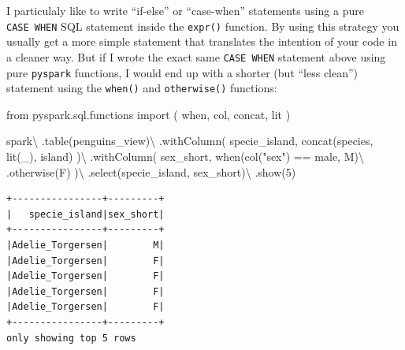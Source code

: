 \documentclass[
  11pt,
  letterpaper,
  DIV=11,
  numbers=noendperiod]{scrreprt}
\newenvironment{Shaded}{\begin{snugshade}}{\end{snugshade}}
\newcommand{\DecValTok}[1]{\textcolor[rgb]{0.68,0.00,0.00}{#1}}
\newcommand{\ImportTok}[1]{\textcolor[rgb]{0.00,0.46,0.62}{#1}}
\newcommand{\NormalTok}[1]{\textcolor[rgb]{0.00,0.23,0.31}{#1}}
\newcommand{\OperatorTok}[1]{\textcolor[rgb]{0.37,0.37,0.37}{#1}}
\newcommand{\StringTok}[1]{\textcolor[rgb]{0.13,0.47,0.30}{#1}}
\begin{document}
I particulaly like to write ``if-else'' or ``case-when'' statements
using a pure \texttt{CASE\ WHEN} SQL statement inside the
\texttt{expr()} function. By using this strategy you usually get a more
simple statement that translates the intention of your code in a cleaner
way. But if I wrote the exact same \texttt{CASE\ WHEN} statement above
using pure \texttt{pyspark} functions, I would end up with a shorter
(but ``less clean'') statement using the \texttt{when()} and
\texttt{otherwise()} functions:

\begin{Shaded}
\begin{Highlighting}[]
\ImportTok{from}\NormalTok{ pyspark.sql.functions }\ImportTok{import}\NormalTok{ (}
\NormalTok{  when, col,}
\NormalTok{  concat, lit}
\NormalTok{)}

\NormalTok{spark}\OperatorTok{\textbackslash{}}
\NormalTok{  .table(}\StringTok{\textquotesingle{}penguins\_view\textquotesingle{}}\NormalTok{)}\OperatorTok{\textbackslash{}}
\NormalTok{  .withColumn(}
    \StringTok{\textquotesingle{}specie\_island\textquotesingle{}}\NormalTok{,}
\NormalTok{    concat(}\StringTok{\textquotesingle{}species\textquotesingle{}}\NormalTok{, lit(}\StringTok{\textquotesingle{}\_\textquotesingle{}}\NormalTok{), }\StringTok{\textquotesingle{}island\textquotesingle{}}\NormalTok{)}
\NormalTok{  )}\OperatorTok{\textbackslash{}}
\NormalTok{  .withColumn(}
    \StringTok{\textquotesingle{}sex\_short\textquotesingle{}}\NormalTok{,}
\NormalTok{    when(col(}\StringTok{"sex"}\NormalTok{) }\OperatorTok{==} \StringTok{\textquotesingle{}male\textquotesingle{}}\NormalTok{, }\StringTok{\textquotesingle{}M\textquotesingle{}}\NormalTok{)}\OperatorTok{\textbackslash{}}
\NormalTok{      .otherwise(}\StringTok{\textquotesingle{}F\textquotesingle{}}\NormalTok{)}
\NormalTok{  )}\OperatorTok{\textbackslash{}}
\NormalTok{  .select(}\StringTok{\textquotesingle{}specie\_island\textquotesingle{}}\NormalTok{, }\StringTok{\textquotesingle{}sex\_short\textquotesingle{}}\NormalTok{)}\OperatorTok{\textbackslash{}}
\NormalTok{  .show(}\DecValTok{5}\NormalTok{)}
\end{Highlighting}
\end{Shaded}

\begin{verbatim}
+----------------+---------+
|   specie_island|sex_short|
+----------------+---------+
|Adelie_Torgersen|        M|
|Adelie_Torgersen|        F|
|Adelie_Torgersen|        F|
|Adelie_Torgersen|        F|
|Adelie_Torgersen|        F|
+----------------+---------+
only showing top 5 rows
\end{verbatim}
\end{document}
